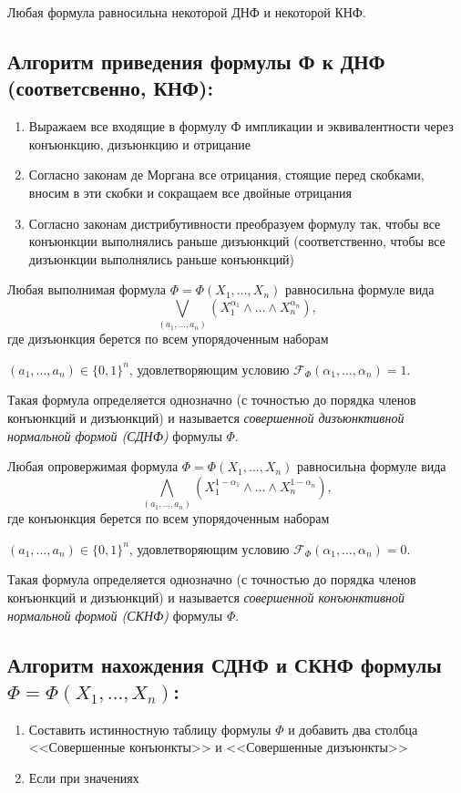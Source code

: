 \begin{theorem}
    Любая формула равносильна некоторой ДНФ и некоторой КНФ.
\end{theorem}

\subsection*{Алгоритм приведения формулы Ф к ДНФ \\(соответсвенно, КНФ):}

\begin{enumerate}
    \item Выражаем все входящие в формулу Ф импликации и эквивалентности через конъюнкцию, дизъюнкцию и отрицание
    \item Согласно законам де Моргана все отрицания, стоящие перед скобками, вносим в эти скобки и сокращаем все двойные отрицания
    \item Согласно законам дистрибутивности преобразуем формулу так, чтобы все конъюнкции выполнялись раньше дизъюнкций (соответственно, чтобы все дизъюнкции выполнялись раньше конъюнкций)
\end{enumerate}

\begin{theorem}
    Любая выполнимая формула $\Phi = \Phi(X_1,\ldots,X_n)$ равносильна формуле вида
    $$\bigvee_{(a_1,\ldots,a_n)} (X_1^{\alpha_1}\land\ldots\land X_n^{\alpha_n}),$$
    где дизъюнкция берется по всем упорядоченным наборам 
    
    $(a_1,\ldots,a_n)\in\{0,1\}^n$, удовлетворяющим условию $\mathcal{F}_\Phi(\alpha_1,\ldots,\alpha_n) = 1$.
\end{theorem}

Такая формула определяется однозначно (с точностью до порядка членов конъюнкций и дизъюнкций) и называется \textit{совершенной дизъюнктивной нормальной формой (СДНФ)} формулы $\Phi$.

\begin{theorem}
    Любая опровержимая формула $\Phi = \Phi(X_1,\ldots,X_n)$ равносильна формуле вида
    $$\bigwedge_{(a_1,\ldots,a_n)} (X_1^{1-\alpha_1}\land\ldots\land X_n^{1-\alpha_n}),$$
    где конъюнкция берется по всем упорядоченным наборам

    $(a_1,\ldots,a_n)\in\{0,1\}^n$, удовлетворяющим условию $\mathcal{F}_\Phi(\alpha_1,\ldots,\alpha_n) = 0$.
\end{theorem}

Такая формула определяется однозначно (с точностью до порядка членов конъюнкций и дизъюнкций) и называется \textit{совершенной конъюнктивной нормальной формой (СКНФ)} формулы $\Phi$.

\subsection*{Алгоритм нахождения СДНФ и СКНФ формулы \\$\Phi = \Phi(X_1,\ldots,X_n)$:}
\begin{enumerate}
    \item Составить истинностную таблицу формулы $\Phi$ и добавить два столбца <<Совершенные конъюнкты>> и <<Совершенные дизъюнкты>>
    \item Если при значениях 
\end{enumerate}